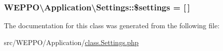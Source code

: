 \subsubsection[{\texorpdfstring{\$settings}{$settings}}]{\setlength{\rightskip}{0pt plus 5cm}W\+E\+P\+P\+O\textbackslash{}\+Application\textbackslash{}\+Settings\+::\$settings = \mbox{[}$\,$\mbox{]}\hspace{0.3cm}{\ttfamily [protected]}}\hypertarget{classWEPPO_1_1Application_1_1Settings_ad99df8f4422446f29e4e625d7c80aaed}{}\label{classWEPPO_1_1Application_1_1Settings_ad99df8f4422446f29e4e625d7c80aaed}


The documentation for this class was generated from the following file\+:\begin{DoxyCompactItemize}
\item 
src/\+W\+E\+P\+P\+O/\+Application/\hyperlink{class_8Settings_8php}{class.\+Settings.\+php}\end{DoxyCompactItemize}
